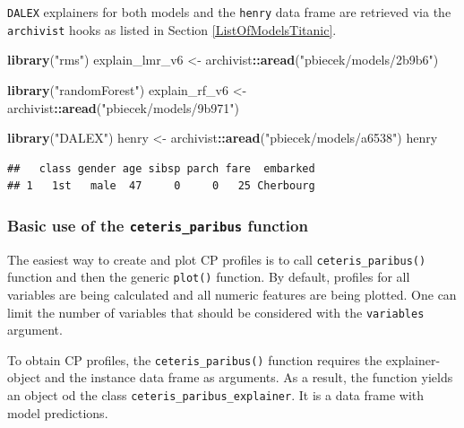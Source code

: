 \documentclass[12pt,]{krantz}
\newenvironment{Shaded}{\begin{snugshade}}{\end{snugshade}}
\newcommand{\KeywordTok}[1]{\textcolor[rgb]{0.13,0.29,0.53}{\textbf{#1}}}
\newcommand{\NormalTok}[1]{#1}
\newcommand{\OperatorTok}[1]{\textcolor[rgb]{0.81,0.36,0.00}{\textbf{#1}}}
\newcommand{\StringTok}[1]{\textcolor[rgb]{0.31,0.60,0.02}{#1}}
\begin{document}
\texttt{DALEX} explainers for both models and the \texttt{henry} data frame are retrieved via the \texttt{archivist} hooks as listed in Section \ref{ListOfModelsTitanic}.

\begin{Shaded}
\begin{Highlighting}[]
\KeywordTok{library}\NormalTok{(}\StringTok{"rms"}\NormalTok{)}
\NormalTok{explain_lmr_v6 <-}\StringTok{ }\NormalTok{archivist}\OperatorTok{::}\KeywordTok{aread}\NormalTok{(}\StringTok{"pbiecek/models/2b9b6"}\NormalTok{)}

\KeywordTok{library}\NormalTok{(}\StringTok{"randomForest"}\NormalTok{)}
\NormalTok{explain_rf_v6 <-}\StringTok{ }\NormalTok{archivist}\OperatorTok{::}\KeywordTok{aread}\NormalTok{(}\StringTok{"pbiecek/models/9b971"}\NormalTok{)}

\KeywordTok{library}\NormalTok{(}\StringTok{"DALEX"}\NormalTok{)}
\NormalTok{henry <-}\StringTok{ }\NormalTok{archivist}\OperatorTok{::}\KeywordTok{aread}\NormalTok{(}\StringTok{"pbiecek/models/a6538"}\NormalTok{)}
\NormalTok{henry}
\end{Highlighting}
\end{Shaded}

\begin{verbatim}
##   class gender age sibsp parch fare  embarked
## 1   1st   male  47     0     0   25 Cherbourg
\end{verbatim}

\hypertarget{basic-use-of-the-ceteris_paribus-function}{%
\subsubsection{\texorpdfstring{Basic use of the \texttt{ceteris\_paribus} function}{Basic use of the ceteris\_paribus function}}\label{basic-use-of-the-ceteris_paribus-function}}

The easiest way to create and plot CP profiles is to call \texttt{ceteris\_paribus()} function and then the generic \texttt{plot()} function. By default, profiles for all variables are being calculated and all numeric features are being plotted. One can limit the number of variables that should be considered with the \texttt{variables} argument.

To obtain CP profiles, the \texttt{ceteris\_paribus()} function requires the explainer-object and the instance data frame as arguments. As a result, the function yields an object od the class \texttt{ceteris\_paribus\_explainer}. It is a data frame with model predictions.
\end{document}
